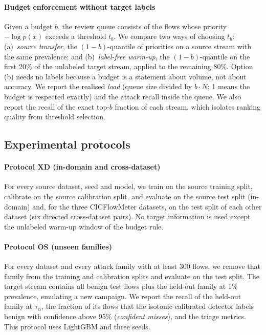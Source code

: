 \paragraph{Budget enforcement without target labels} Given a budget $b$, the review queue consists of the flows whose priority $-\log p(x)$ exceeds a threshold $t_b$. We compare two ways of choosing $t_b$: (a)~\emph{source transfer}, the $(1-b)$-quantile of priorities on a source stream with the same prevalence; and (b)~\emph{label-free warm-up}, the $(1-b)$-quantile on the first 20\% of the unlabeled target stream, applied to the remaining 80\%. Option (b) needs no labels because a budget is a statement about volume, not about accuracy. We report the realised \emph{load} (queue size divided by $b\cdot N$; 1 means the budget is respected exactly) and the attack recall inside the queue. We also report the recall of the exact top-$b$ fraction of each stream, which isolates ranking quality from threshold selection.

\subsection{Experimental protocols}
\paragraph{Protocol XD (in-domain and cross-dataset)} For every source dataset, seed and model, we train on the source training split, calibrate on the source calibration split, and evaluate on the source test split (in-domain) and, for the three CICFlowMeter datasets, on the test split of each other dataset (six directed cross-dataset pairs). No target information is used except the unlabeled warm-up window of the budget rule.
\paragraph{Protocol OS (unseen families)} For every dataset and every attack family with at least 300 flows, we remove that family from the training and calibration splits and evaluate on the test split. The target stream contains all benign test flows plus the held-out family at 1\% prevalence, emulating a new campaign. We report the recall of the held-out family at $\tau_\alpha$, the fraction of its flows that the isotonic-calibrated detector labels benign with confidence above 95\% (\emph{confident misses}), and the triage metrics. This protocol uses LightGBM and three seeds.
